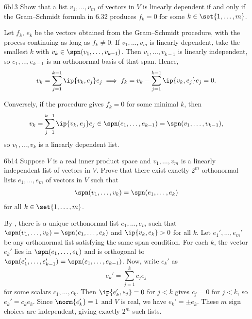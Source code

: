 \begin{exercise}{6b13}
    Show that a list $v_1, \ldots, v_m$ of vectors in $V$ is linearly dependent if and only if the Gram--Schmidt formula in 6.32 produces $f_k = 0$ for some $k \in \set{1, \ldots, m}$.

\end{exercise}

\begin{sol}
    Let $f_k$, $e_k$ be the vectors obtained from the Gram--Schmidt procedure, with the process continuing as long as $f_k \neq 0$.
    If $v_1, \ldots, v_m$ is linearly dependent, take the smallest $k$ with $v_k \in \spn(v_1, \ldots, v_{k-1})$.
    Then $v_1, \ldots, v_{k-1}$ is linearly independent, so $e_1, \ldots, e_{k-1}$ is an orthonormal basis of that span.
    Hence,
    \[
        v_k = \sum_{j=1}^{k-1} \ip{v_k, e_j} e_j \implies f_k = v_k - \sum_{j=1}^{k-1} \ip{v_k, e_j} e_j = 0.
    \]

    Conversely, if the procedure gives $f_k = 0$ for some minimal $k$, then
    \[
        v_k = \sum_{j=1}^{k-1} \ip{v_k, e_j} e_j \in \spn(e_1, \ldots, e_{k-1}) = \spn(v_1, \ldots, v_{k-1}),
    \]
    so $v_1, \ldots, v_k$ is a linearly dependent list.
\end{sol}

\begin{exercise}{6b14}
    Suppose $V$ is a real inner product space and $v_1, \ldots, v_m$ is a linearly independent list of vectors in $V$.
    Prove that there exist exactly $2^m$ orthonormal lists $e_1, \ldots, e_m$ of vectors in $V$ such that
    \[
        \spn(v_1, \ldots, v_k) = \spn(e_1, \ldots, e_k)
    \]
    for all $k \in \set{1, \ldots, m}$.
\end{exercise}

\begin{sol}
    By , there is a unique orthonormal list $e_1, \ldots, e_m$ such that $\spn(v_1, \ldots, v_k) = \spn(e_1, \ldots, e_k)$ and $\ip{v_k, e_k} > 0$ for all $k$.
    Let $e_1', \ldots, e_m'$ be any orthonormal list satisfying the same span condition.
    For each $k$, the vector $e_k'$ lies in $\spn(e_1, \ldots, e_k)$ and is orthogonal to $\spn(e_1', \ldots, e_{k-1}') = \spn(e_1, \ldots, e_{k-1})$.
    Now, write $e_k'$ as
    \[
        e_k' = \sum_{j=1}^{k} c_j e_j
    \]
    for some scalars $c_1, \ldots, c_k$.
    Then $\ip{e_k', e_j} = 0$ for $j < k$ gives $c_j = 0$ for $j < k$, so $e_k' = c_k e_k$.
    Since $\norm{e_k'} = 1$ and $V$ is real, we have $e_k' = \pm e_k$.
    These $m$ sign choices are independent, giving exactly $2^m$ such lists.
\end{sol}

